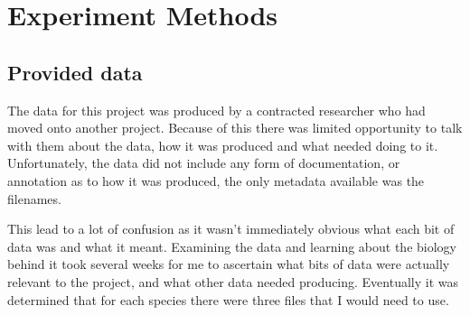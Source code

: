 \chapter{Experiment Methods}

% 
% 
% 
% 

\section{Provided data}
The data for this project was produced by a contracted researcher who had moved onto another project. Because of this there was limited opportunity to talk with them about the data, how it was produced and what needed doing to it. Unfortunately, the data did not include any form of documentation, or annotation as to how it was produced, the only metadata available was the filenames. 

This lead to a lot of confusion as it wasn't immediately obvious what each bit of data was and what it meant. Examining the data and learning about the biology behind it took several weeks for me to ascertain what bits of data were actually relevant to the project, and what other data needed producing. Eventually it was determined that for each species there were three files that I would need to use.

